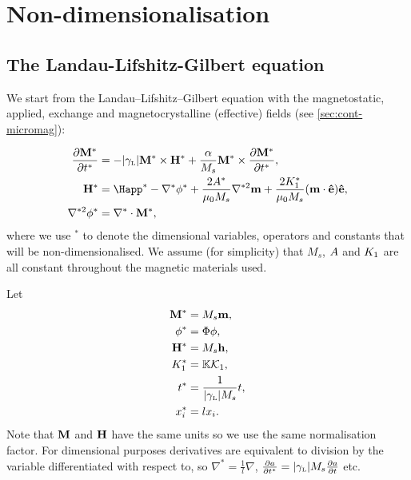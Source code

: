 
\chapter{Non-dimensionalisation}
\label{sec:normalisations-appendix}



\section{The Landau-Lifshitz-Gilbert equation}
\label{sec:land-lifsh-gilb-normalisation}

We start from the Landau--Lifshitz--Gilbert equation with the magnetostatic, applied, exchange and magnetocrystalline (effective) fields (see \autoref{sec:cont-micromag}):

\begin{align}
  \pd{\Mv^*}{t^*} &= - \gymagc \Mv^* \times \Hv^* + \frac{\alpha}{M_s} \Mv^* \times \pd{\Mv^*}{t^*}, \label{eqn:llgnd} \\
  \Hv^* &= \Happ^* - \nabla^* \phi^* + \frac{2\Exchc^*}{\mu_0 M_s} \nabla^{*2} \mv + \frac{2\Kone^*}{\mu_0 M_s} (\mv \cdot \ev) \ev,
  \label{eqn:effnd} \\
  \nabla^{*2} \phi^* &= \nabla^* \cdot \Mv^*, \label{eqn:phind}
\end{align}
where we use $^*$ to denote the dimensional variables, operators and constants that will be non-dimensionalised. We assume (for simplicity) that $M_s$, $A$ and $K_1$ are all
constant throughout the magnetic materials used.

Let
\begin{align}
  \mathbf{M}^* &= M_s \mathbf{m}, \notag \\
  \phi^* &= \Phi \phi, \notag \\
  \mathbf{H}^* &= M_s \mathbf{h}, \label{eqn:nddefs} \\
  K_1^* &= \mathbb{K} \mathcal{K}_1, \notag \\
  t^* &= \frac{1}{{\left|{\gamma_{\text{\tiny{L}}}} \right|} M_s} t, \notag \\
  x_i^* &= l x_i. \notag
\end{align}
Note that $\mathbf{M}$ and $\mathbf{H}$ have the same units so we use the same normalisation factor. For dimensional purposes derivatives are equivalent to division by the variable differentiated with respect to, so $\nabla^* = \frac{1}{l} \nabla$, $\frac{\partial a}{\partial t^*} = {\left|{\gamma_{\text{\tiny{L}}}} \right|} M_s \frac{\partial a}{\partial t}$ etc.

